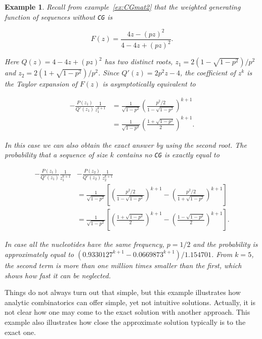 \documentclass{article}
\newtheorem{example}{Example}
\begin{document}
\begin{example}
Recall from example~\ref{ex:CGmat2} that the weighted generating function
of sequences without \texttt{CG} is

\begin{equation*}
F(z) = \frac{4z-(pz)^2}{4-4z+(pz)^2}.
\end{equation*}

Here $Q(z) = 4-4z+(pz)^2$ has two distinct roots, $z_1 =
2(1-\sqrt{1-p^2})/p^2$ and $z_2 = 2(1+\sqrt{1-p^2})/p^2$. Since $Q'(z) =
2p^2z-4$, the coefficient of $z^k$ is the Taylor expansion of $F(z)$ is
asymptotically equivalent to

\begin{equation*}
\begin{split}
-\frac{P(z_1)}{Q'(z_1)}\frac{1}{z_1^{k+1}} &=
\frac{1}{\sqrt{1-p^2}}
\left( \frac{p^2/2}{1-\sqrt{1-p^2}} \right)^{k+1} \\
&= \frac{1}{\sqrt{1-p^2}} \left(\frac{1+\sqrt{1-p^2}}{2} \right)^{k+1}.
\end{split}
\end{equation*}

In this case we can also obtain the exact answer by using the second root.
The probability that a sequence of size $k$ contains no \texttt{CG} is
exactly equal to

\begin{equation*}
\begin{split}
-\frac{P(z_1)}{Q'(z_1)}\frac{1}{z_1^{k+1}}
&-\frac{P(z_2)}{Q'(z_2)}\frac{1}{z_2^{k+1}} \\
&=
\frac{1}{\sqrt{1-p^2}} \left[
\left( \frac{p^2/2}{1-\sqrt{1-p^2}} \right)^{k+1}
- \left( \frac{p^2/2}{1+\sqrt{1-p^2}} \right)^{k+1}\right] \\
&= \frac{1}{\sqrt{1-p^2}} \left[
\left(\frac{1+\sqrt{1-p^2}}{2} \right)^{k+1} -
\left(\frac{1-\sqrt{1-p^2}}{2} \right)^{k+1} \right].
\end{split}
\end{equation*}

In case all the nucleotides have the same frequency, $p=1/2$ and the
probability is approximately equal to $(0.9330127^{k+1} - 0.0669873^{k+1})
/ 1.154701$. From $k=5$, the second term is more than one million times
smaller than the first, which shows how fast it can be neglected.
\end{example}

Things do not always turn out that simple, but this example illustrates
how analytic combinatorics can offer simple, yet not intuitive solutions.
Actually, it is not clear how one may come to the exact solution with
another approach. This example also illustrates how close the approximate
solution typically is to the exact one.
\end{document}
